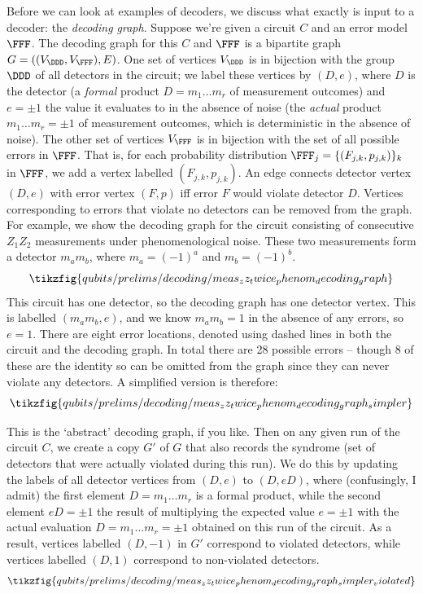 Before we can look at examples of decoders, we discuss what exactly is input to a decoder: the \textit{decoding graph}.
Suppose we're given a circuit $C$ and an error model $\FFF$.
The decoding graph for this $C$ and $\FFF$ is a bipartite graph $G = ((V_\DDD, V_\FFF), E)$.
One set of vertices $V_\DDD$ is in bijection with the group $\DDD$ of all detectors in the circuit; we label these vertices by $(D, e)$, where $D$ is the detector (a \textit{formal} product $D = m_1 \ldots m_r$ of measurement outcomes) and $e = \pm 1$ the value it evaluates to in the absence of noise (the \textit{actual} product $m_1 \ldots m_r = \pm 1$ of measurement outcomes, which is deterministic in the absence of noise).
The other set of vertices $V_\FFF$ is in bijection with the set of all possible errors in $\FFF$.
That is, for each probability distribution $\FFF_j = \{(F_{j,k}, p_{j,k})\}_k$ in $\FFF$, we add a vertex labelled $(F_{j,k}, p_{j,k})$.
An edge connects detector vertex $(D, e)$ with error vertex $(F, p)$ iff error $F$ would violate detector $D$.
Vertices corresponding to errors that violate no detectors can be removed from the graph.
For example, we show the decoding graph for the circuit consisting of consecutive $Z_1 Z_2$ measurements under phenomenological noise.
These two measurements form a detector $m_a m_b$, where $m_a = (-1)^a$ and $m_b = (-1)^b$.
\begin{equation*}
    \tikzfig{qubits/prelims/decoding/meas_zz_twice_phenom_decoding_graph}
\end{equation*}
This circuit has one detector, so the decoding graph has one detector vertex.
This is labelled $(m_a m_b, e)$, and we know $m_a m_b = 1$ in the absence of any errors, so $e = 1$.
There are eight error locations, denoted using dashed lines in both the circuit and the decoding graph.
In total there are 28 possible errors -- though 8 of these are the identity so can be omitted from the graph since they can never violate any detectors.
A simplified version is therefore:
\begin{equation}
    \tikzfig{qubits/prelims/decoding/meas_zz_twice_phenom_decoding_graph_simpler}
\end{equation}

This is the `abstract' decoding graph, if you like.
Then on any given run of the circuit $C$, we create a copy $G'$ of $G$ that also records the syndrome (set of detectors that were actually violated during this run).
We do this by updating the labels of all detector vertices from $(D, e)$ to $(D, eD)$, where (confusingly, I admit) the first element $D = m_1 \ldots m_r$ is a formal product, while the second element $eD = \pm 1$ the result of multiplying the expected value $e = \pm 1$ with the actual evaluation $D = m_1 \ldots m_r = \pm 1$ obtained on this run of the circuit.
As a result, vertices labelled $(D, -1)$ in $G'$ correspond to violated detectors, while vertices labelled $(D, 1)$ correspond to non-violated detectors.
\begin{equation}
    \tikzfig{qubits/prelims/decoding/meas_zz_twice_phenom_decoding_graph_simpler_violated}
\end{equation}

